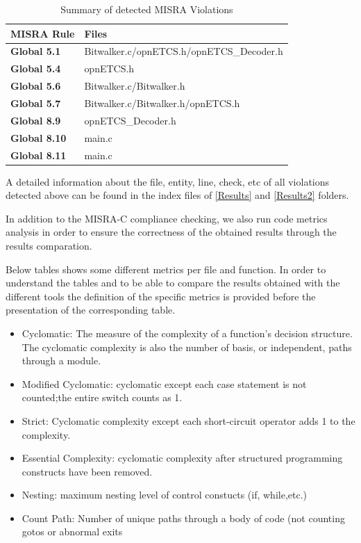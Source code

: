 {\footnotesize\sffamily\centering
  \begin{longtable}{||p{}|p{}||}
  \caption{Summary of detected MISRA Violations}\\
    \hline\hline
    \textbf{MISRA Rule} & \textbf{Files} \\
    \hline\hline
    \endhead
    \hline\hline
    \endfoot
    \textbf{Global 5.1}
& Bitwalker.c/opnETCS.h/opnETCS\_Decoder.h
    \\
    \hline
    \textbf{Global 5.4}
& opnETCS.h
    \\
    \hline
    \textbf{Global 5.6}
& Bitwalker.c/Bitwalker.h
    \\
    \hline
    \textbf{Global 5.7}
& Bitwalker.c/Bitwalker.h/opnETCS.h
    \\
    \hline
    \textbf{Global 8.9}
& opnETCS\_Decoder.h
    \\
    \hline
    \textbf{Global 8.10}
& main.c
    \\
    \hline
    \textbf{Global 8.11}
& main.c
    \\
    \hline
\end{longtable}}

A detailed information about the file, entity, line, check, etc of all violations detected above can be found in the index files of \href{https://github.com/openETCS/validation/blob/master/VnVUserStories/VnVUserStorySQS/04-Results/results}{[Results]} and \href{https://github.com/openETCS/validation/blob/master/VnVUserStories/VnVUserStorySQS/04-Results/results2}{[Results2]} folders.

In addition to the MISRA-C compliance checking, we also run code metrics analysis in order to ensure the correctness of the obtained results through the results comparation.

Below tables shows some different metrics per file and function.
In order to understand the tables and to be able to compare the results obtained with the different tools the definition of the specific metrics is provided before the presentation of the corresponding table.
\begin{itemize}
\item Cyclomatic: The measure of the complexity of a function's decision structure. The cyclomatic complexity is also the number of basis, or independent, paths through a module. 
\item Modified Cyclomatic: cyclomatic except each case statement is not counted;the entire switch counts as 1.
\item Strict: Cyclomatic complexity except each short-circuit operator adds 1 to the complexity.
\item Essential Complexity: cyclomatic complexity after structured programming constructs have been removed.
\item Nesting: maximum nesting level of control constucts (if, while,etc.)
\item Count Path: Number of unique paths through a body of code (not counting gotos or abnormal exits
\end{itemize}


